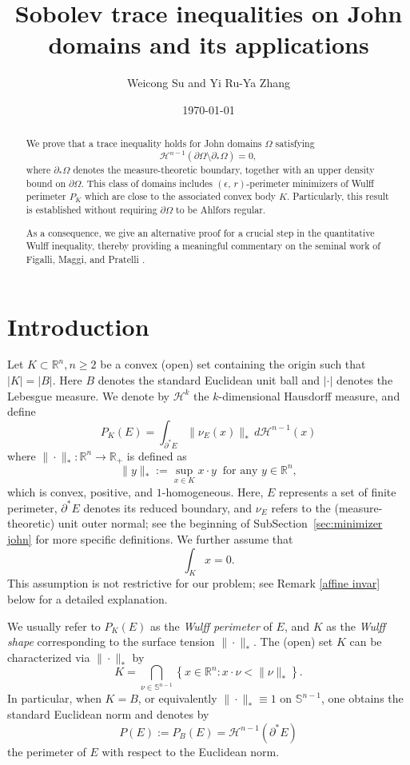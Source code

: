 \documentclass[reqno,11pt]{amsart}
\title[Sobolev trace inequalities on John domains and its applications]{Sobolev trace inequalities on John domains and its applications}
\author{Weicong Su and Yi Ru-Ya Zhang}
\date{\today}
\def\ez{\epsilon}
\numberwithin{equation}{section}
\theoremstyle{remark}
\begin{document}

\begin{abstract}
We prove that a trace inequality holds for John domains $\Omega$ satisfying
$$ \mathcal H^{n-1}(\partial \Omega\setminus \partial_*\Omega)=0,$$ 
where $\partial_*\Omega$ denotes the measure-theoretic boundary, together with  an upper density bound on $\partial \Omega$. This class of domains includes  $(\ez,\,r)$-perimeter minimizers of Wulff perimeter $P_K$ which are close to the associated convex body $K$. Particularly, this result is established without requiring $\partial \Omega$ to be Ahlfors regular. 

As a consequence, we give an alternative proof for a crucial step in the quantitative Wulff inequality, thereby providing a meaningful commentary on the seminal work of Figalli, Maggi, and Pratelli \cite{FMP2010}. 
\end{abstract}





\maketitle
\section{Introduction}

 Let $K \subset \mathbb{R}^n, n\ge 2$ be a convex (open) set containing the origin such that $|K| = |B|$.
Here $B$ denotes the standard Euclidean unit ball and  $|\cdot|$ denotes the Lebesgue measure.  We denote by $\mathcal H^{k}$ the $k$-dimensional Hausdorff measure, and define
$$P_K(E)=\int_{\partial^*E} \|\nu_E(x)\|_{*}\, d\mathcal H^{n-1}(x)$$
where $\|\cdot\|_{*}: \mathbb{R}^{n} \to \mathbb{R}_+$ is defined as $$\|y\|_{*}:=\sup_{x\in K}x\cdot y  \ \text{ for any } y\in \mathbb R^n,$$
which is convex, positive, and  $1$-homogeneous. Here, $E$ represents a set of finite perimeter, $\partial^*E$ denotes its reduced boundary, and $\nu_E$ refers to the (measure-theoretic) unit outer normal; see the beginning of SubSection~\ref{sec:minimizer john} for more specific definitions. We further assume that 
$$\int_K x=0.$$
This assumption is not restrictive for our problem; see Remark \ref{affine invar} below for a detailed explanation.

We usually refer to 
 $P_K(E)$ as the \emph{Wulff perimeter} of $E$, and $K$ as the \emph{Wulff shape} corresponding to the surface tension 
 $\|\cdot\|_{*}$. 
The (open) set $K$ can be characterized via $\|\cdot\|_{*}$ by
$$K=\bigcap_{\nu\in \mathbb S^{n-1}} \left\{x\in \mathbb R^n\colon x\cdot \nu < \|\nu\|_{*} \right\}.$$
In particular, when $K=B$, or equivalently $\|\cdot\|_{*}\equiv 1$ on $\mathbb S^{n-1}$,  one obtains the standard Euclidean norm and denotes by 
$$P(E):=P_B(E)=\mathcal{H}^{n-1}(\partial^* E)$$
the perimeter of $E$ with respect to the Euclidean norm. 
\end{document}
